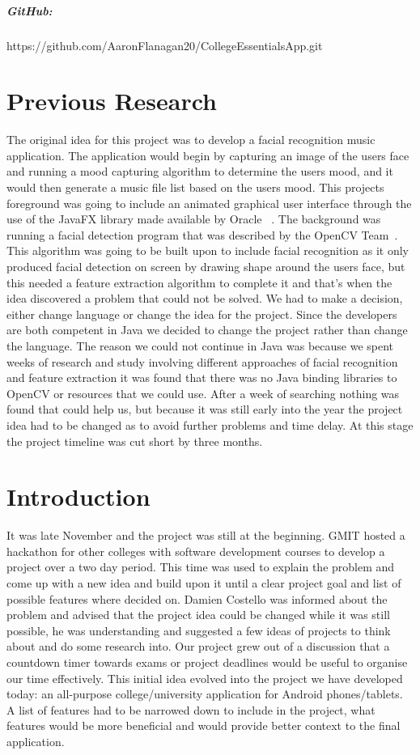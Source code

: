 \paragraph{GitHub:} https://github.com/AaronFlanagan20/CollegeEssentialsApp.git

\chapter*{Previous Research}
The original idea for this project was to develop a facial recognition music application. The application would begin by capturing an image of the users face and running a mood capturing algorithm to determine the users mood, and it would then generate a music file list based on the users mood. This projects foreground was going to include an animated graphical user interface through the use of the JavaFX library made available by Oracle ~\cite{javafx}. The background was running a facial detection program that was described by the OpenCV Team~\cite{opencv}. This algorithm was going to be built upon to include facial recognition as it only produced facial detection on screen by drawing shape around the users face, but this needed a feature extraction algorithm to complete it and that's when the idea discovered a problem that could not be solved. We had to make a decision,  either change language or change the idea for the project. Since the developers are both competent in Java we decided to change the project rather than change the language. The reason we could not continue in Java was because we spent weeks of research and study involving different approaches of facial recognition and feature extraction it was found that there was no Java binding libraries to OpenCV or resources that we could use. After a week of searching nothing was found that could help us, but because it was still early into the year the project idea had to be changed as to avoid further problems and time delay. At this stage the project timeline was cut short by three months.

\chapter{Introduction}
It was late November and the project was still at the beginning. GMIT hosted a hackathon for other colleges with software development courses to develop a project over a two day period. This time was used to explain the problem and come up with a new idea and build upon it until a clear project goal and list of possible features where decided on. Damien Costello was informed about the problem and advised that the project idea could be changed while it was still possible, he was understanding and suggested a few ideas of projects to think about and do some research into. Our project grew out of a discussion that a countdown timer towards exams or project deadlines would be useful to organise our time effectively. This initial idea evolved into the project we have developed today: an all-purpose college/university application for Android phones/tablets. A list of features had to be narrowed down to include in the project, what features would be more beneficial and would provide better context to the final application. 

